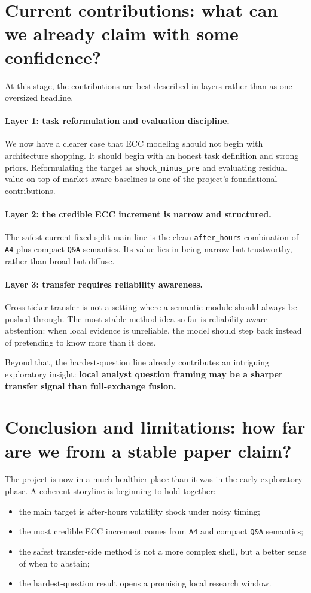 \documentclass[11pt]{article}
\begin{document}
\section{Current contributions: what can we already claim with some confidence?}
At this stage, the contributions are best described in layers rather than as one oversized headline.

\paragraph{Layer 1: task reformulation and evaluation discipline.}
We now have a clearer case that ECC modeling should not begin with architecture shopping. It should begin with an honest task definition and strong priors. Reformulating the target as \texttt{shock\_minus\_pre} and evaluating residual value on top of market-aware baselines is one of the project's foundational contributions.

\paragraph{Layer 2: the credible ECC increment is narrow and structured.}
The safest current fixed-split main line is the clean \texttt{after\_hours} combination of \texttt{A4} plus compact \texttt{Q\&A} semantics. Its value lies in being narrow but trustworthy, rather than broad but diffuse.

\paragraph{Layer 3: transfer requires reliability awareness.}
Cross-ticker transfer is not a setting where a semantic module should always be pushed through. The most stable method idea so far is reliability-aware abstention: when local evidence is unreliable, the model should step back instead of pretending to know more than it does.

Beyond that, the hardest-question line already contributes an intriguing exploratory insight: \textbf{local analyst question framing may be a sharper transfer signal than full-exchange fusion.}

\section{Conclusion and limitations: how far are we from a stable paper claim?}
The project is now in a much healthier place than it was in the early exploratory phase. A coherent storyline is beginning to hold together:
\begin{itemize}
    \item the main target is after-hours volatility shock under noisy timing;
    \item the most credible ECC increment comes from \texttt{A4} and compact \texttt{Q\&A} semantics;
    \item the safest transfer-side method is not a more complex shell, but a better sense of when to abstain;
    \item the hardest-question result opens a promising local research window.
\end{itemize}
\end{document}
